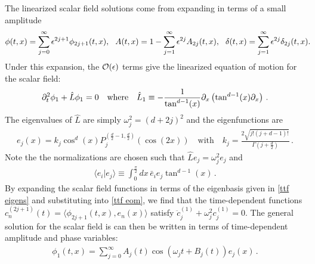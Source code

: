 \documentclass[../PhD.tex]{subfiles}
\begin{document}
The linearized scalar field solutions come from expanding in terms of a small amplitude
\begin{align}
\label{eps expansion}
\phi(t,x) = \sum_{j=0}^\infty \epsilon^{2j+1} \phi_{2j+1}(t,x), \quad \! \! A(t,x) = 1 - \sum_{j=1}^\infty \epsilon^{2j} A_{2j}(t,x), \quad \! \! \delta(t,x) = \sum_{j=1}^\infty \epsilon^{2j} \delta_{2j} (t,x) . \hspace{-0.1in}
\end{align}
Under this expansion, the $\mathcal O(\epsilon)$ terms give the linearized equation of motion for the scalar field:
\begin{align}
\label{ttf eom}
\partial^2_t \phi_1 + \hat L \phi_1 = 0 \quad \text{where} \quad \hat L_1 \equiv - \frac{1}{\tan^{d-1}(x)} \partial_x \left( \tan^{d-1}(x) \partial_x \right) \, .
\end{align}
The eigenvalues of $\hat L$ are simply $\omega^2_j = \left(d + 2j\right)^2$ and the eigenfunctions are
\begin{align}
\label{ttf eigens}
e_j (x) = k_j \cos^d (x) P^{(\frac{d}{2} - 1, \frac{d}{2})}_j \left( \cos(2x) \right) \quad \text{with} \quad k_j = \frac{2 \sqrt{j! (j + d - 1)!}}{\Gamma(j + \frac{d}{2})} \, .
\end{align}
Note the the normalizations are chosen such that $\hat L e_j = \omega^2_j e_j$ and 
\begin{align}
\langle e_i | e_j \rangle \equiv \int^{\frac{\pi}{2}}_0 dx \, \bar e_i e_j \tan^{d-1}(x) \, .
\end{align}
By expanding the scalar field functions in terms of the eigenbasis given in \eqref{ttf eigens} and substituting into \eqref{ttf eom}, we find that the time-dependent functions {$c^{(2j + 1)}_n (t) = \langle \phi_{2j + 1}(t,x), e_n (x) \rangle$} satisfy {$\ddot c_j^{(1)} + \omega^2_j c_j^{(1)} = 0$}. The general solution for the scalar field is can then be written in terms of time-dependent amplitude and phase variables:
\begin{align}
\label{ttf phi}
\phi_1 (t,x) = \sum_{j=0}^\infty A_j (t) \cos \left(\omega_j t + B_j(t) \right) e_j (x) \, .
\end{align}
\end{document}
